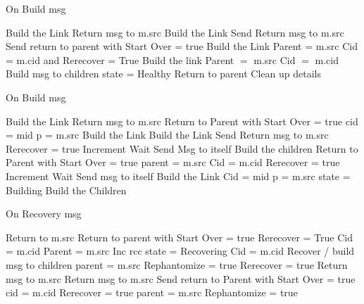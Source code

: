 \documentclass{article}
\begin{document}
	
\begin{algorithm}
\caption{On Build msg}
\label{Build message received}
\begin{algorithmic}[1]
	\State Build the Link
	\State Return msg to m.src
		\State Build the Link
		\State Send Return msg to m.src
	\Else
						\State Send return to parent with Start Over = true
		\EndIf
		\State Build the Link
		\State Parent = m.src
		\State Cid = m.cid and Rerecover = True
	\EndIf
{}
	\State Build the link
	\State Parent $=$ m.src
	\State Cid $=$ m.cid
		\State Build msg to children
	\Else
		\State state = Healthy
		\State Return to parent
		\State Clean up details
	\EndIf
{}
\end{algorithmic}
\end{algorithm}	


\begin{algorithm}
\caption{On Build msg}
\label{Build message received}
\begin{algorithmic}[1]
		\State Build the Link
		\State Return msg to m.src
	\Else
			\State Return to Parent with Start Over = true
		\EndIf
		\State cid = mid
		\State p = m.src
		\State Build the Link
	\EndIf
{}
		\State Build the Link
		\State Send Return msg to m.src
		\State Rerecover = true
		\State Increment Wait
		\State Send Msg to itself
	\Else
		\State Build the children
			\State Return to Parent with Start Over = true
		\EndIf
		\State parent = m.src
		\State Cid = m.cid
		\State Rerecover = true
		\State Increment Wait
		\State Send msg to itself
	\EndIf
{}
	\State Build the Link
	\State Cid = mid
	\State p = m.src
	\State state = Building
	\State Build the Children
\EndIf
\EndProcedure
\end{algorithmic}
\end{algorithm}	

\begin{algorithm}
\caption{On Recovery msg}
\label{Recovery message received}
\begin{algorithmic}[1]
	\State Return to m.src
		\State Return to parent with Start Over = true
	\EndIf
	\State Rerecover = True
	\State Cid = m.cid
	\State Parent = m.src
	\State Inc rcc
	\State state = Recovering
	\State Cid = m.cid
	\State Recover / build msg to children
	\State parent = m.src
		\State Rephantomize = true
		\State Rerecover = true
		\State Return msg to m.src
		\State Return msg to m.src
	\Else
			\State Send return to Parent with Start Over = true
		\EndIf
		\State cid = m.cid
		\State Rerecover = true
		\State parent = m.src
		\State Rephantomize = true
	\EndIf
{}
\end{algorithmic}
\end{algorithm}	
\end{document}
